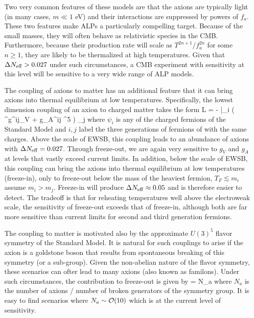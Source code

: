 Two very common features of these models are that the axions are typically light (in many cases, $m \ll 1$ eV) and their interactions are suppressed by powers of $f_a$.  These two features make ALPs a particularly compelling target.  Because of the small masses, they will often behave as relativistic species in the CMB.  Furthermore, because their production rate will scale as $T^{2n +1} / f_a^{2n}$ for some $n \geq 1$, they are likely to be thermalized at high temperatures.  Given that $\Delta N_{\rm eff} > 0.027$ under such circumstances, a CMB experiment with sensitivity at this level will be sensitive to a very wide range of ALP models.

The coupling of axions to matter has an additional feature that it can bring axions into thermal equilibrium at low temperatures.  Specifically, the lowest dimension coupling of an axion to charged matter takes the form
\beq
{\cal L} = -  \bar \psi_i ( \gamma^\mu g^{ij}_V + g_A^{ij} \gamma^5 ) \psi_j
\eeq
where $\psi_{i}$ is any of the charged fermions of the Standard Model and $i,j$ label the three generations of fermions of with the same charges.  Above the scale of EWSB, this coupling leads to an abundance of axions with $\Delta N_{\rm eff} = 0.027$.  Through freeze-out, we are again very sensitive to $g_V$ and $g_A$ at levels that vastly exceed current limits.  In addition, below the scale of EWSB, this coupling can bring the axions into thermal equilibrium at low temperatures (freeze-in), only to freeze-out below the mass of the heaviest fermion, $T_F \lesssim m_{i}$ assume $m_i > m_j$.  Freeze-in will produce $\Delta N_{\rm eff} \approx 0.05$ and is therefore easier to detect.  The tradeoff is that for reheating temperatures well above the electroweak scale, the sensitivity of freeze-out exceeds that of freeze-in, although both are far more sensitive than current limits for second and third generation fermions.

The coupling to matter is motivated also by the approximate $U(3)^5$ flavor symmetry of the Standard Model.  It is natural for such couplings to arise if the axion is a goldstone boson that results from spontaneous breaking of this symmetry (or a sub-group).  Given the non-abelian nature of the flavor symmetry, these scenarios can ofter lead to many axions (also known as familons).  Under such circumstances, the contribution to freeze-out is given by 
\beq
\Delta \Neff = N_a 
\eeq
where $N_a$ is the number of axions / number of broken generators of the symmetry group.  It is easy to find scenarios where $N_a\sim {\cal O}(10)$ which is at the current level of sensitivity.


